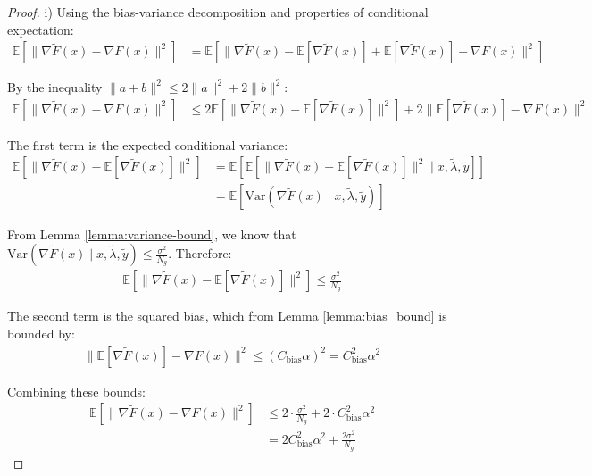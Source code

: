 \documentclass[letterpaper]{article} %
\newcommand{\1}{\mathbf{1}}
\begin{document}
\hypergradaccuracy*
\begin{proof}
i) Using the bias-variance decomposition and properties of conditional expectation:
\begin{align}
\mathbb{E}[\|\nabla\tilde{F}(x) - \nabla F(x)\|^2] &= \mathbb{E}[\|\nabla\tilde{F}(x) - \mathbb{E}[\nabla\tilde{F}(x)] + \mathbb{E}[\nabla\tilde{F}(x)] - \nabla F(x)\|^2]
\end{align}

By the inequality $\|a+b\|^2 \leq 2\|a\|^2 + 2\|b\|^2$:
\begin{align}
\mathbb{E}[\|\nabla\tilde{F}(x) - \nabla F(x)\|^2] &\leq 2\mathbb{E}[\|\nabla\tilde{F}(x) - \mathbb{E}[\nabla\tilde{F}(x)]\|^2] + 2\|\mathbb{E}[\nabla\tilde{F}(x)] - \nabla F(x)\|^2
\end{align}

The first term is the expected conditional variance:
\begin{align}
\mathbb{E}[\|\nabla\tilde{F}(x) - \mathbb{E}[\nabla\tilde{F}(x)]\|^2] &= \mathbb{E}[\mathbb{E}[\|\nabla\tilde{F}(x) - \mathbb{E}[\nabla\tilde{F}(x)]\|^2 \mid x, \tilde{\lambda}, \tilde{y}]] \\
&= \mathbb{E}[\text{Var}(\nabla\tilde{F}(x) \mid x, \tilde{\lambda}, \tilde{y})]
\end{align}

From Lemma \ref{lemma:variance-bound}, we know that $\text{Var}(\nabla\tilde{F}(x) \mid x, \tilde{\lambda}, \tilde{y}) \leq \frac{\sigma^2}{N_g}$. Therefore:
\begin{align}
\mathbb{E}[\|\nabla\tilde{F}(x) - \mathbb{E}[\nabla\tilde{F}(x)]\|^2] \leq \frac{\sigma^2}{N_g}
\end{align}

The second term is the squared bias, which from Lemma \ref{lemma:bias_bound} is bounded by:
\begin{align}
\|\mathbb{E}[\nabla\tilde{F}(x)] - \nabla F(x)\|^2 \leq (C_{\text{bias}} \alpha)^2 = C_{\text{bias}}^2 \alpha^2
\end{align}

Combining these bounds:
\begin{align}
\mathbb{E}[\|\nabla\tilde{F}(x) - \nabla F(x)\|^2] &\leq 2 \cdot \frac{\sigma^2}{N_g} + 2 \cdot C_{\text{bias}}^2 \alpha^2 \\
&= 2 C_{\text{bias}}^2 \alpha^2 + \frac{2 \sigma^2}{N_g}
\end{align}
\end{proof}
\end{document}
